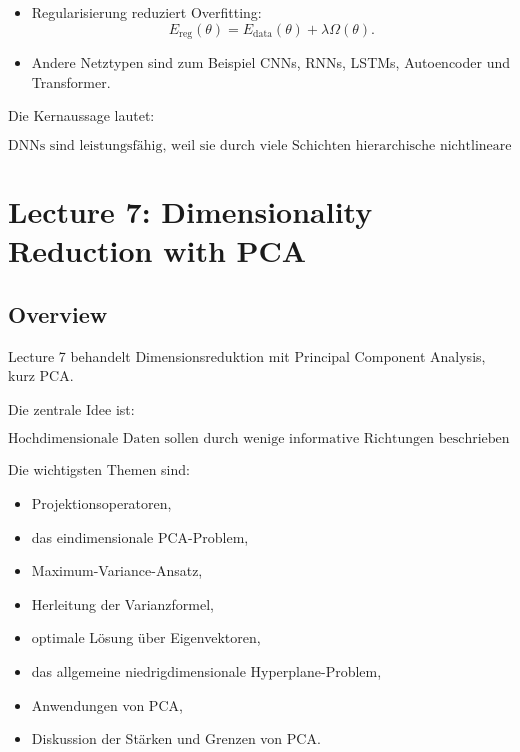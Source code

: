 \documentclass[11pt,a4paper]{scrartcl}
\begin{document}
\begin{answerbox}
\begin{itemize}
        \item Regularisierung reduziert Overfitting:
        \[
            E_{\mathrm{reg}}(\theta)
            =
            E_{\mathrm{data}}(\theta)
            +
            \lambda \Omega(\theta).
        \]

        \item Andere Netztypen sind zum Beispiel CNNs, RNNs, LSTMs,
        Autoencoder und Transformer.
    \end{itemize}

    Die Kernaussage lautet:

    \[
        \boxed{
            \text{DNNs sind leistungsfähig, weil sie durch viele Schichten
            hierarchische nichtlineare Repräsentationen lernen.}
        }
    \]
\end{answerbox}

\section{Lecture 7: Dimensionality Reduction with PCA}

\subsection{Overview}

\begin{notebox}
    Lecture 7 behandelt Dimensionsreduktion mit Principal Component Analysis,
    kurz PCA.

    Die zentrale Idee ist:

    \[
        \text{Hochdimensionale Daten sollen durch wenige informative Richtungen beschrieben werden.}
    \]

    Die wichtigsten Themen sind:

    \begin{itemize}
        \item Projektionsoperatoren,
        \item das eindimensionale PCA-Problem,
        \item Maximum-Variance-Ansatz,
        \item Herleitung der Varianzformel,
        \item optimale Lösung über Eigenvektoren,
        \item das allgemeine niedrigdimensionale Hyperplane-Problem,
        \item Anwendungen von PCA,
        \item Diskussion der Stärken und Grenzen von PCA.
    \end{itemize}
\end{notebox}
\end{document}
